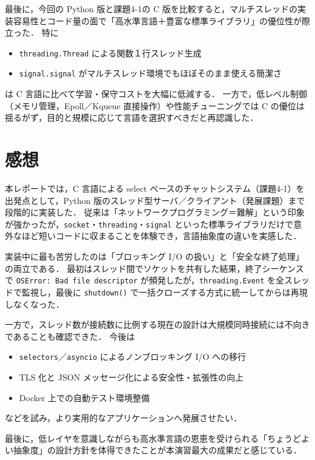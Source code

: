 \documentclass[a4j,10pt]{jarticle}
\begin{document}
最後に，今回の Python 版と課題4-1の C 版を比較すると，マルチスレッドの実装容易性とコード量の面で「高水準言語＋豊富な標準ライブラリ」の優位性が際立った．
特に
\begin{itemize}
  \item \lstinline|threading.Thread| による関数１行スレッド生成
  \item \lstinline|signal.signal| がマルチスレッド環境でもほぼそのまま使える簡潔さ
\end{itemize}
は C 言語に比べて学習・保守コストを大幅に低減する．
一方で，低レベル制御（メモリ管理，Epoll／Kqueue 直接操作）や性能チューニングでは C の優位は揺るがず，目的と規模に応じて言語を選択すべきだと再認識した．


\section{感想}
本レポートでは，C 言語による select ベースのチャットシステム（課題4-1）を出発点として，Python 版のスレッド型サーバ／クライアント（発展課題）まで段階的に実装した．  
従来は「ネットワークプログラミング＝難解」という印象が強かったが，\texttt{socket}・\texttt{threading}・\texttt{signal} といった標準ライブラリだけで意外なほど短いコードに収まることを体験でき，言語抽象度の違いを実感した．

実装中に最も苦労したのは「ブロッキング I/O の扱い」と「安全な終了処理」の両立である．  
最初はスレッド間でソケットを共有した結果，終了シーケンスで \texttt{OSError: Bad file descriptor} が頻発したが，\texttt{threading.Event} を全スレッドで監視し，最後に \texttt{shutdown()} で一括クローズする方式に統一してからは再現しなくなった．  

一方で，スレッド数が接続数に比例する現在の設計は大規模同時接続には不向きであることも確認できた．  
今後は
\begin{itemize}
  \item \texttt{selectors}／\texttt{asyncio} によるノンブロッキング I/O への移行
  \item TLS 化と JSON メッセージ化による安全性・拡張性の向上
  \item Docker 上での自動テスト環境整備
\end{itemize}
などを試み，より実用的なアプリケーションへ発展させたい．

最後に，低レイヤを意識しながらも高水準言語の恩恵を受けられる「ちょうどよい抽象度」の設計方針を体得できたことが本演習最大の成果だと感じている．
\end{document}

